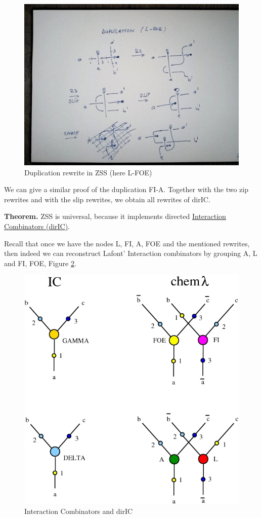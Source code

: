 \documentclass[]{article}
\begin{document}
\begin{figure}[h!]
\centering
\includegraphics[width=0.75\linewidth]{img/3854.jpg}
\caption{Duplication rewrite in ZSS (here L-FOE)}
\label{Duplication rewrite in ZSS}
\end{figure}

We can give a similar proof of the duplication FI-A. Together
with the two zip rewrites and with the slip rewrites, we obtain all
rewrites of dirIC.

\textbf{Theorem.} ZSS is universal, because it implements directed
\href{https://mbuliga.github.io/quinegraphs/ic-vs-chem.html\#icvschem}{Interaction
Combinators (dirIC)}.

Recall that once we have the nodes L, FI, A, FOE and the mentioned
rewrites, then indeed we can reconstruct Lafont' Interaction combinators
by grouping A, L and FI, FOE, Figure \ref{Interaction-Combinators-and-dirIC}.

\begin{figure}[h!]
\centering
\includegraphics[width=0.6\linewidth]{img/dirIC.jpg}
\caption{Interaction Combinators and dirIC}
\label{Interaction-Combinators-and-dirIC}
\end{figure}
\end{document}
